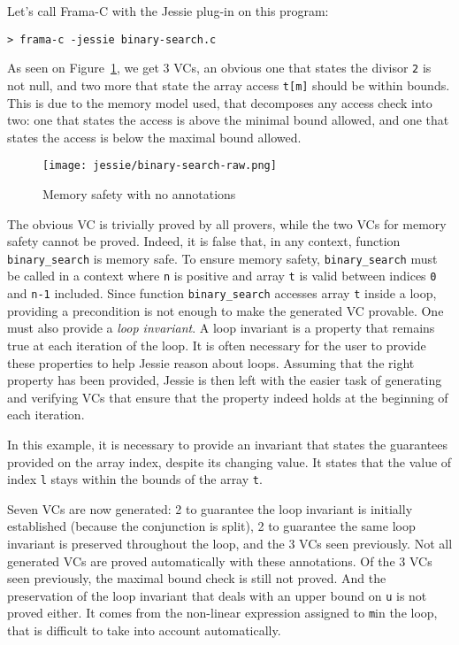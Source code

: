 \documentclass[a4paper,11pt,twoside,openright]{report}
\begin{document}
Let's call Frama-C with the Jessie plug-in on this program:

\begin{verbatim}
> frama-c -jessie binary-search.c
\end{verbatim}

As seen on Figure~\ref{fig:raw}, we get 3 VCs, an obvious one that
states the divisor \verb|2| is not null, and two more that state the
array access \verb|t[m]| should be within bounds. This is due to the
memory model used, that decomposes any access check into two: one that
states the access is above the minimal bound allowed, and one that
states the access is below the maximal bound allowed.

\begin{figure}[t]
  \begin{center}
  \texttt{[image: jessie/binary-search-raw.png]}
  \end{center}
  \caption{Memory safety with no annotations}
  \label{fig:raw}
  \hrulefill
\end{figure}

The obvious VC is trivially proved by all provers, while the two VCs
for memory safety cannot be proved. Indeed, it is false that, in any
context, function \verb|binary_search| is memory safe. To ensure
memory safety, \verb|binary_search| must be called in a context 
where \verb|n| is positive and array \verb|t| is valid
between indices \verb|0| and \verb|n-1| included. Since function
\verb|binary_search| accesses array \verb|t| inside a loop, 
providing a precondition is not
enough to make the generated VC provable.
One must also provide a {\em loop invariant}. A loop invariant
is a property that remains true at each iteration of the loop.
It is often necessary for the user to provide these properties
to help Jessie reason about loops. Assuming that the right property
has been provided, Jessie is then left with the easier task of
generating and verifying VCs that ensure that the property indeed
holds at the beginning of each iteration.

In this example, it is necessary to provide an invariant 
that states the guarantees provided on the array 
index, despite its changing value. It
states that the value of index \verb|l| stays within the bounds of the
array \verb|t|.



Seven VCs are now generated: 2 to guarantee the loop invariant is
initially established (because the conjunction is split), 2 to guarantee
the same loop invariant is preserved throughout the loop, and the 3 VCs
seen previously. Not all generated VCs are proved automatically with
these annotations. Of the 3 VCs seen previously, the maximal bound
check is still not proved. And the preservation of the loop invariant
that deals with an upper bound on \verb|u| is not proved either. It
comes from the non-linear expression assigned to \verb|m|in the loop,
that is difficult to take into account automatically. 
\end{document}
